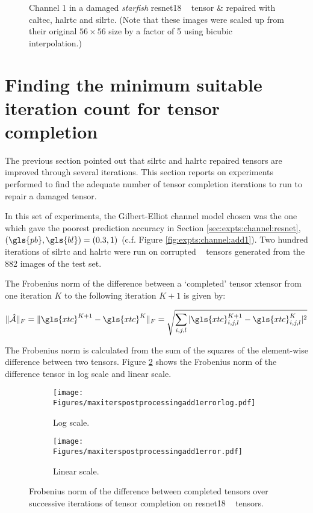 \begin{figure}[H]
	\caption[Channel 1 visualization in a damaged starfish image ResNet18 tensor]{Channel 1 in a damaged \textit{starfish} \gls{resnet18} \addone~ tensor \& repaired with \gls{caltec}, \gls{halrtc} and \gls{silrtc}. (Note that these images were scaled up from their original $56 \times 56$ size by a factor of 5 using bicubic interpolation.)}
	\label{fig:expt:repair:starfish}
\end{figure}


\section{Finding the minimum suitable iteration count for tensor completion} \label{sec:expts:iter}

The previous section pointed out that \gls{silrtc} and \gls{halrtc} repaired tensors are improved through several iterations. This section reports on experiments performed to find the adequate number of tensor completion iterations to run to repair a damaged tensor.

In this set of experiments, the Gilbert-Elliot channel model chosen was the one which gave the poorest prediction accuracy in Section \ref{sec:expts:channel:resnet}, $(\gls{pb},\gls{bl}) = (0.3,1)$ (c.f. Figure \ref{fig:expts:channel:add1}). Two hundred iterations of \gls{silrtc} and \gls{halrtc} were run on corrupted \addone~ tensors generated from the 882 images of the test set.

The Frobenius norm of the difference between a `completed' tensor \gls{xtensor} from one iteration $K$ to the following iteration $K+1$ is given by:

\begin{equation}
	\lVert \hat{\mathcal{A}} \rVert_F = \lVert \gls{xtc}^{K+1} - \gls{xtc}^{K} \rVert_F = \sqrt{\sum_{i,j,l} | \gls{xtc}_{i,j,l}^{K+1} - \gls{xtc}_{i,j,l}^{K} |^2}
\end{equation}

The Frobenius norm is calculated from the sum of the squares of the element-wise difference between two tensors. Figure \ref{fig:expts:maxiters} shows the Frobenius norm of the difference tensor in log scale and linear scale.

\begin{figure}[H]
	\centering
	\begin{subfigure}{.49\textwidth}
		\centering
		\texttt{[image: Figures/maxiterspostprocessingadd1errorlog.pdf]}
		\caption{Log scale.}
	\end{subfigure}
\hfill
\begin{subfigure}{0.49\textwidth}
	\texttt{[image: Figures/maxiterspostprocessingadd1error.pdf]}
	\caption{Linear scale.}
\end{subfigure}
	\caption[Difference between completed tensors over successive iterations of tensor completion in ResNet18]{Frobenius norm of the difference between completed tensors over successive iterations of tensor completion on \gls{resnet18} \addone~ tensors.} \label{fig:expts:maxiters}
\end{figure}

